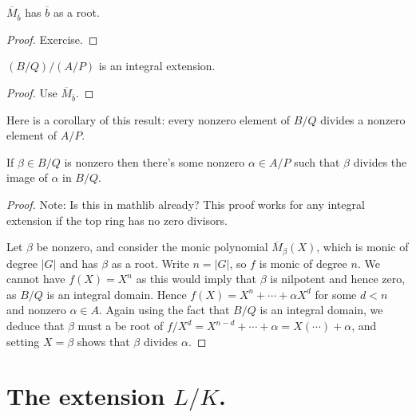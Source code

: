 \begin{theorem}
  \label{MulSemiringAction.CharacteristicPolynomial.Mbar_eval_eq_zero}
  $\overline{M}_{\overline{b}}$ has $\overline{b}$ as a root.
\end{theorem}
\begin{proof} Exercise.
\end{proof}

\begin{theorem}
  \label{MulSemiringAction.reduction_isIntegral}
  $(B/Q)/(A/P)$ is an integral extension.
\end{theorem}
\begin{proof}
  Use $\overline{M}_{\overline{b}}$.
\end{proof}

Here is a corollary of this result: every nonzero element of $B/Q$ divides
a nonzero element of $A/P$.
\begin{corollary}
  \label{Algebra.exists_dvd_nonzero_if_isIntegral}
  If $\beta\in B/Q$ is nonzero then there's some nonzero $\alpha\in A/P$
  such that $\beta$ divides the image of $\alpha$ in $B/Q$.
\end{corollary}
\begin{proof} Note: Is this in mathlib already? This proof works for any
  integral extension if the top ring has no zero divisors.

  Let $\beta$ be nonzero, and
  consider the monic polynomial $\overline{M}_\beta(X)$, which is monic of
  degree $|G|$ and has $\beta$ as a root. Write $n=|G|$, so $f$ is monic
  of degree $n$. We cannot have $f(X)=X^n$ as this would imply that $\beta$ is
  nilpotent and hence zero, as $B/Q$ is an integral domain. Hence $f(X)=X^n+\cdots +\alpha X^d$
  for some $d<n$ and nonzero $\alpha\in A$. Again using the fact that $B/Q$ is an integral domain, we
  deduce that $\beta$ must a be root of $f/X^d=X^{n-d}+\cdots+\alpha=X(\cdots)+\alpha$, and setting
  $X=\beta$ shows that $\beta$ divides $\alpha$.
\end{proof}

\section{The extension $L/K$.}


